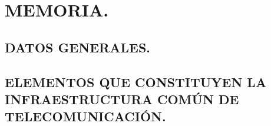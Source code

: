 \chapter{MEMORIA.}

\section{DATOS GENERALES.}





\section{ELEMENTOS QUE CONSTITUYEN LA INFRAESTRUCTURA COMÚN DE TELECOMUNICACIÓN.}










